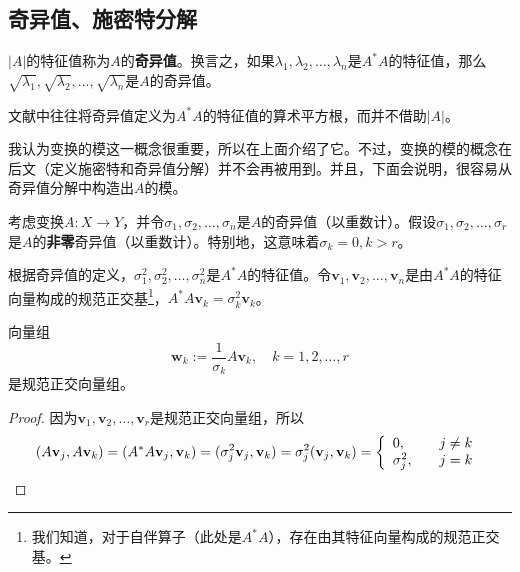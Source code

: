\subsection{奇异值、施密特分解}

\begin{definition*}
    $|A|$的特征值称为$A$的{\bf 奇异值}。换言之，如果$\lambda_{1},\lambda_{2},\ldots,\lambda_{n}$是$A^*A$的特征值，那么$\sqrt{\lambda_{1}},\sqrt{\lambda_{2}},\ldots,\sqrt{\lambda_{n}}$是$A$的奇异值。
\end{definition*}
\begin{remark*}
    文献中往往将奇异值定义为$A^*A$的特征值的算术平方根，而并不借助$|A|$。

    我认为变换的模这一概念很重要，所以在上面介绍了它。不过，变换的模的概念在后文（定义施密特和奇异值分解）并不会再被用到。并且，下面会说明，很容易从奇异值分解中构造出$A$的模。
\end{remark*}

考虑变换$A:X\to Y$，并令$\sigma_1,\sigma_2,\ldots,\sigma_n$是$A$的奇异值（以重数计）。假设$\sigma_1,\sigma_2,\ldots,\sigma_r$是$A$的{\bf 非零}奇异值（以重数计）。特别地，这意味着$\sigma_k=0,k>r$。

根据奇异值的定义，$\sigma_{1}^{2},\sigma_{2}^{2},\ldots,\sigma_{n}^{2}$是$A^*A$的特征值。令$\mathbf{v}_{1},\mathbf{v}_{2},\ldots,$\linebreak $\mathbf{v}_{n}$是由$A^*A$的特征向量构成的规范正交基\footnote{我们知道，对于自伴算子（此处是$A^*A$），存在由其特征向量构成的规范正交基。}，$A^{*}A\mathbf{v}_{k}=\sigma_{k}^{2}\mathbf{v}_{k}$。

\begin{proposition}
    向量组\[\mathbf{w}_k:=\frac{1}{\sigma_k}A\mathbf{v}_k,\quad k=1,2,\ldots,r\]
    是规范正交向量组。
\end{proposition}

\begin{proof}
    因为$\mathbf{v}_{1},\mathbf{v}_{2},\ldots,\mathbf{v}_{r}$是规范正交向量组，所以
    \[(A\mathbf{v}_j,A\mathbf{v}_k)=(A^*A\mathbf{v}_j,\mathbf{v}_k)=(\sigma_j^2\mathbf{v}_j,\mathbf{v}_k)=\sigma_j^2(\mathbf{v}_j,\mathbf{v}_k)=\left\{\begin{array}{ll}0,&\quad j\neq k\\\sigma_j^2,&\quad j=k\end{array}\right.\qedhere\]
\end{proof}

